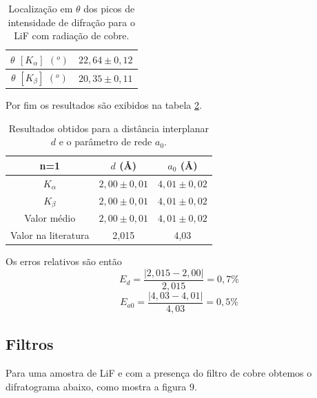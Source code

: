 \documentclass[article,12pt,openright,oneside,a4paper,brazil]{abntex2}
\begin{document}
\begin{table}[H]
    \centering
    \caption{Localização em $\theta$ dos picos de intensidade de difração para o LiF com radiação de cobre.}
    \begin{tabular}{|c|c|}
        \hline
        $\theta$ $[K_\alpha]$ $(^o)$ & $22,64\pm0,12$ \\ \hline
        $\theta$ $[K_\beta]$ $(^o)$ & $20,35\pm0,11$ \\ \hline
    \end{tabular}
    \label{tab:dLiF}
\end{table}

Por fim os resultados são exibidos na tabela \ref{tab:LiF}.

\begin{table}[H]
    \centering
    \caption{Resultados obtidos para a distância interplanar $d$ e o parâmetro de rede $a_0$.}
    \begin{tabular}{|c|c|c|}
        \hline
        n=1 & $d$ (\r{A}) & $a_0$ (\r{A}) \\ \hline
        $K_\alpha$ & $2,00\pm0,01$ & $4,01\pm0,02$ \\ \hline
        $K_\beta$ & $2,00\pm0,01$ & $4,01\pm0,02$ \\ \hline
        Valor médio & $2,00\pm0,01$ & $4,01\pm0,02$ \\ \hline
        Valor na literatura & 2,015 & 4,03 \\ \hline
    \end{tabular}
    \label{tab:LiF}
\end{table}

Os erros relativos são então
$$E_d=\frac{|2,015-2,00|}{2,015}=0,7\%$$
$$E_{a0}=\frac{|4,03-4,01|}{4,03}=0,5\%$$

\subsection{Filtros}

Para uma amostra de LiF e com a presença do filtro de cobre obtemos o difratograma abaixo, como mostra a figura 9.
\end{document}
